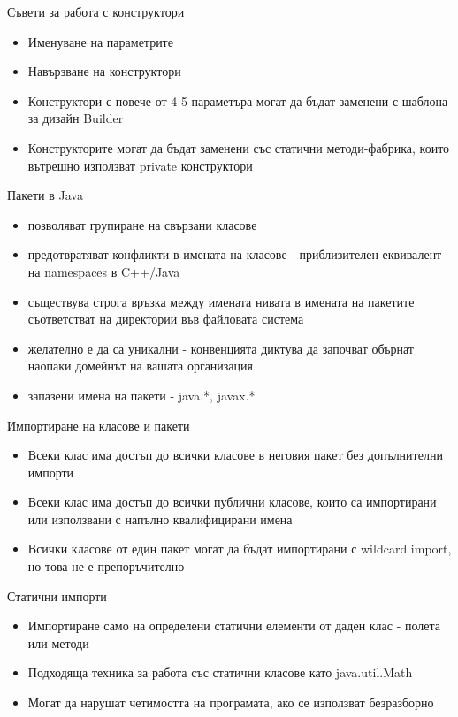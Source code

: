 \documentclass{beamer}
\begin{document}
\begin{frame}{Съвети за работа с конструктори}
  \transdissolve
  \begin{itemize}
  \item Именуване на параметрите
  \item Навързване на конструктори
  \item Конструктори с повече от 4-5 параметъра могат да бъдат
    заменени с шаблона за дизайн Builder
  \item Конструкторите могат да бъдат заменени със статични
    методи-фабрика, които вътрешно използват private конструктори
  \end{itemize}
\end{frame}

\begin{frame}{Пакети в Java}
  \transdissolve
  \begin{itemize}
  \item позволяват групиране на свързани класове
  \item предотвратяват конфликти в имената на класове - приблизителен
    еквивалент на namespaces в C++/Java
  \item съществува строга връзка между имената нивата в имената на
    пакетите съответстват на директории във файловата система
  \item желателно е да са уникални - конвенцията диктува да започват
    обърнат наопаки домейнът на вашата организация
  \item запазени имена на пакети - java.*, javax.*
  \end{itemize}
\end{frame}

\begin{frame}{Импортиране на класове и пакети}
  \transdissolve
  \begin{itemize}
  \item Всеки клас има достъп до всички класове в неговия пакет без
    допълнителни импорти
  \item Всеки клас има достъп до всички публични класове, които са
    импортирани или използвани с напълно квалифицирани имена
  \item Всички класове от един пакет могат да бъдат импортирани с
    wildcard import, но това не е препоръчително
  \end{itemize}
\end{frame}

\begin{frame}{Статични импорти}
  \transdissolve
  \begin{itemize}
  \item Импортиране само на определени статични елементи от даден клас
    - полета или методи
  \item Подходяща техника за работа със статични класове като
    java.util.Math
  \item Могат да нарушат четимостта на програмата, ако се използват безразборно
  \end{itemize}
\end{frame}
\end{document}

